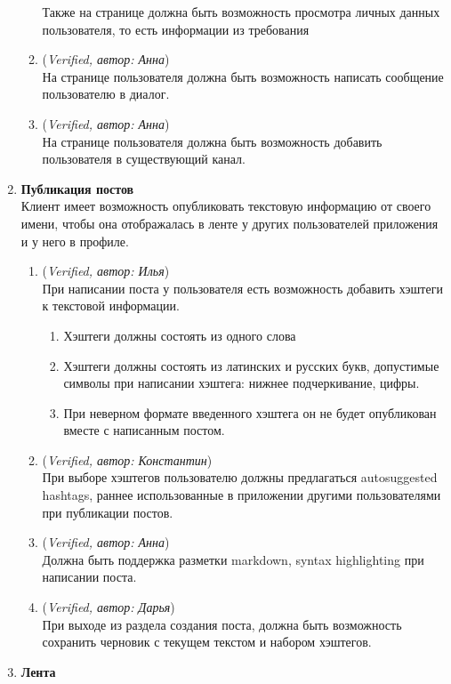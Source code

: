 \begin{enumerate}
\begin{enumerate}
		Также на странице должна быть возможность просмотра личных данных пользователя, то есть информации из требования 
		\item (\textit{Verified, автор: Анна})\\
		На странице пользователя должна быть возможность написать сообщение пользователю в диалог.
		\item (\textit{Verified, автор: Анна})\\
		На странице пользователя должна быть возможность добавить пользователя в существующий канал.
	\end{enumerate}
	\item \textbf{Публикация постов\\} 
	Клиент имеет возможность опубликовать текстовую информацию от своего имени, чтобы она отображалась в ленте у других пользователей приложения и у него в профиле.
	\begin{enumerate}
		\item (\textit{Verified, автор: Илья})\\
		При написании поста у пользователя есть возможность добавить хэштеги к текстовой информации.
		\begin{enumerate}
			\item Хэштеги должны состоять из одного слова
			\item Хэштеги должны состоять из латинских и русских букв, допустимые символы при написании хэштега: нижнее подчеркивание, цифры.
			\item При неверном формате введенного хэштега он не будет опубликован вместе с написанным постом.
		\end{enumerate}
		\item (\textit{Verified, автор: Константин})\\
		При выборе хэштегов пользователю должны предлагаться autosuggested hashtags, раннее использованные в приложении другими пользователями при публикации постов.
		\item (\textit{Verified, автор: Анна})\\
		Должна быть поддержка разметки markdown, syntax highlighting при написании поста. 
		\item (\textit{Verified, автор: Дарья})\\
		При выходе из раздела создания поста, должна быть возможность сохранить черновик с текущем текстом и набором хэштегов. 
	\end{enumerate}
	\item \textbf{Лента\\}

\end{enumerate}
